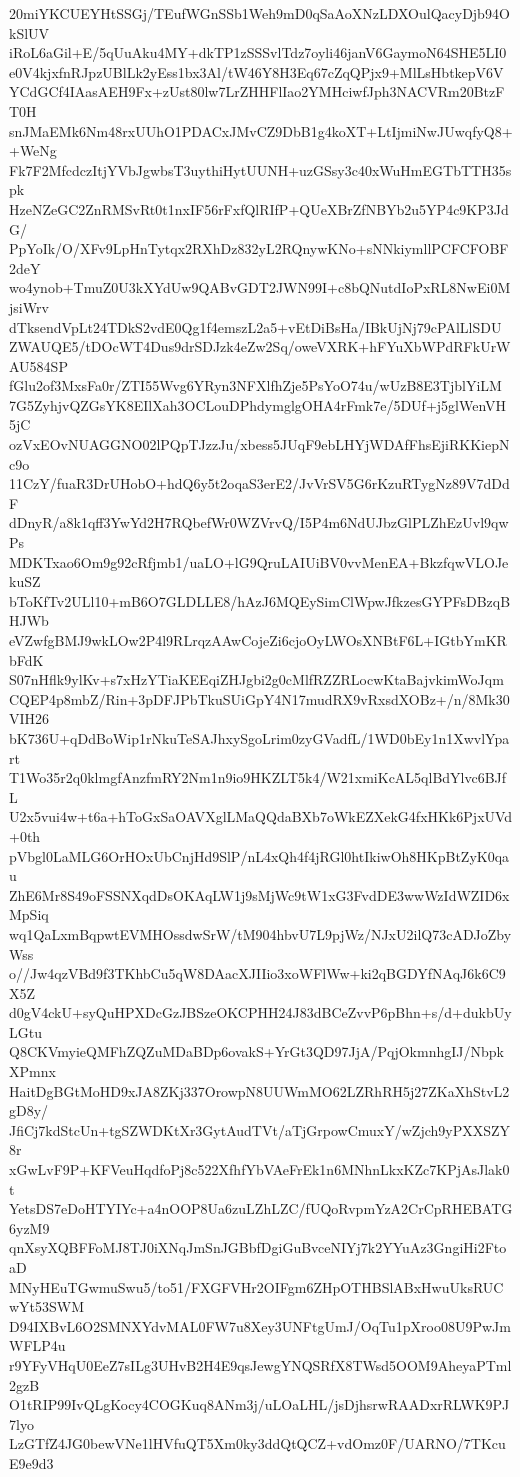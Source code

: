 20miYKCUEYHtSSGj/TEufWGnSSb1Weh9mD0qSaAoXNzLDXOulQacyDjb94OkSlUV
iRoL6aGil+E/5qUuAku4MY+dkTP1zSSSvlTdz7oyli46janV6GaymoN64SHE5LI0
e0V4kjxfnRJpzUBlLk2yEss1bx3Al/tW46Y8H3Eq67cZqQPjx9+MlLsHbtkepV6V
YCdGCf4IAasAEH9Fx+zUst80lw7LrZHHFlIao2YMHciwfJph3NACVRm20BtzFT0H
snJMaEMk6Nm48rxUUhO1PDACxJMvCZ9DbB1g4koXT+LtIjmiNwJUwqfyQ8++WeNg
Fk7F2MfcdczItjYVbJgwbsT3uythiHytUUNH+uzGSsy3c40xWuHmEGTbTTH35spk
HzeNZeGC2ZnRMSvRt0t1nxIF56rFxfQlRIfP+QUeXBrZfNBYb2u5YP4c9KP3JdG/
PpYoIk/O/XFv9LpHnTytqx2RXhDz832yL2RQnywKNo+sNNkiymllPCFCFOBF2deY
wo4ynob+TmuZ0U3kXYdUw9QABvGDT2JWN99I+c8bQNutdIoPxRL8NwEi0MjsiWrv
dTksendVpLt24TDkS2vdE0Qg1f4emszL2a5+vEtDiBsHa/IBkUjNj79cPAlLlSDU
ZWAUQE5/tDOcWT4Dus9drSDJzk4eZw2Sq/oweVXRK+hFYuXbWPdRFkUrWAU584SP
fGlu2of3MxsFa0r/ZTI55Wvg6YRyn3NFXlfhZje5PsYoO74u/wUzB8E3TjblYiLM
7G5ZyhjvQZGsYK8EIlXah3OCLouDPhdymglgOHA4rFmk7e/5DUf+j5glWenVH5jC
ozVxEOvNUAGGNO02lPQpTJzzJu/xbess5JUqF9ebLHYjWDAfFhsEjiRKKiepNc9o
11CzY/fuaR3DrUHobO+hdQ6y5t2oqaS3erE2/JvVrSV5G6rKzuRTygNz89V7dDdF
dDnyR/a8k1qff3YwYd2H7RQbefWr0WZVrvQ/I5P4m6NdUJbzGlPLZhEzUvl9qwPs
MDKTxao6Om9g92cRfjmb1/uaLO+lG9QruLAIUiBV0vvMenEA+BkzfqwVLOJekuSZ
bToKfTv2ULl10+mB6O7GLDLLE8/hAzJ6MQEySimClWpwJfkzesGYPFsDBzqBHJWb
eVZwfgBMJ9wkLOw2P4l9RLrqzAAwCojeZi6cjoOyLWOsXNBtF6L+IGtbYmKRbFdK
S07nHflk9ylKv+s7xHzYTiaKEEqiZHJgbi2g0cMlfRZZRLocwKtaBajvkimWoJqm
CQEP4p8mbZ/Rin+3pDFJPbTkuSUiGpY4N17mudRX9vRxsdXOBz+/n/8Mk30VIH26
bK736U+qDdBoWip1rNkuTeSAJhxySgoLrim0zyGVadfL/1WD0bEy1n1XwvlYpart
T1Wo35r2q0klmgfAnzfmRY2Nm1n9io9HKZLT5k4/W21xmiKcAL5qlBdYlvc6BJfL
U2x5vui4w+t6a+hToGxSaOAVXglLMaQQdaBXb7oWkEZXekG4fxHKk6PjxUVd+0th
pVbgl0LaMLG6OrHOxUbCnjHd9SlP/nL4xQh4f4jRGl0htIkiwOh8HKpBtZyK0qau
ZhE6Mr8S49oFSSNXqdDsOKAqLW1j9sMjWc9tW1xG3FvdDE3wwWzIdWZID6xMpSiq
wq1QaLxmBqpwtEVMHOssdwSrW/tM904hbvU7L9pjWz/NJxU2ilQ73cADJoZbyWss
o//Jw4qzVBd9f3TKhbCu5qW8DAacXJIIio3xoWFlWw+ki2qBGDYfNAqJ6k6C9X5Z
d0gV4ckU+syQuHPXDcGzJBSzeOKCPHH24J83dBCeZvvP6pBhn+s/d+dukbUyLGtu
Q8CKVmyieQMFhZQZuMDaBDp6ovakS+YrGt3QD97JjA/PqjOkmnhgIJ/NbpkXPmnx
HaitDgBGtMoHD9xJA8ZKj337OrowpN8UUWmMO62LZRhRH5j27ZKaXhStvL2gD8y/
JfiCj7kdStcUn+tgSZWDKtXr3GytAudTVt/aTjGrpowCmuxY/wZjch9yPXXSZY8r
xGwLvF9P+KFVeuHqdfoPj8c522XfhfYbVAeFrEk1n6MNhnLkxKZc7KPjAsJlak0t
YetsDS7eDoHTYIYc+a4nOOP8Ua6zuLZhLZC/fUQoRvpmYzA2CrCpRHEBATG6yzM9
qnXsyXQBFFoMJ8TJ0iXNqJmSnJGBbfDgiGuBvceNIYj7k2YYuAz3GngiHi2FtoaD
MNyHEuTGwmuSwu5/to51/FXGFVHr2OIFgm6ZHpOTHBSlABxHwuUksRUCwYt53SWM
D94IXBvL6O2SMNXYdvMAL0FW7u8Xey3UNFtgUmJ/OqTu1pXroo08U9PwJmWFLP4u
r9YFyVHqU0EeZ7sILg3UHvB2H4E9qsJewgYNQSRfX8TWsd5OOM9AheyaPTml2gzB
O1tRIP99IvQLgKocy4COGKuq8ANm3j/uLOaLHL/jsDjhsrwRAADxrRLWK9PJ7lyo
LzGTfZ4JG0bewVNe1lHVfuQT5Xm0ky3ddQtQCZ+vdOmz0F/UARNO/7TKcuE9e9d3

